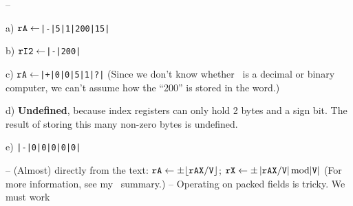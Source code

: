  --
\item{a)} ${\tt rA} \gets${\tt |-|5|1|200|15|}
\item{b)} ${\tt rI2}\gets${\tt |-|200|}
\item{c)} ${\tt rA}\gets${\tt |+|0|0|5|1|?|}\smallskip
\smallskip
\aside(Since we don't know whether \MIX\ is a decimal or binary computer,
we can't assume how the ``200'' is stored in the word.)
\item{d)} {\bf Undefined}, because index registers can only hold 2 bytes and
a sign bit. The result of storing this many non-zero bytes is
undefined.
\item{e)} {\tt |-|0|0|0|0|0|}

 -- (Almost) directly from the text:
               $\tt rA\gets\pm\lfloor rAX/V \rfloor$;
               $\tt rX\gets\pm\left|\tt rAX/V\right|{\rm mod}|V|$
               \smallskip
               \aside(For more information, see my \MIX\ summary.)
 -- Operating on packed fields is tricky. We must work

\bye
